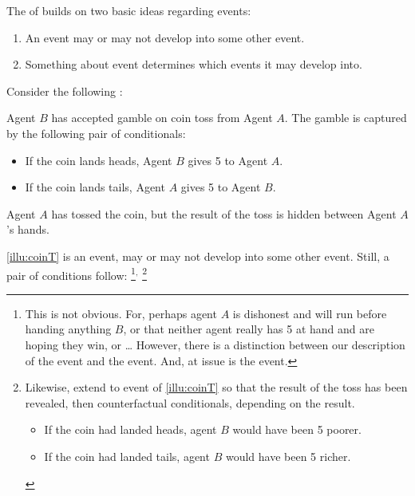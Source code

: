 \begin{note}
  The \itc{} of \qWhyV{} builds on two basic ideas regarding events:
  \begin{enumerate}
  \item
    An event may or may not develop into some other event.
  \item
    Something about event determines which events it may develop into.
  \end{enumerate}

  Consider the following :

  \begin{scenario}%
    \label{illu:coinT}%
    Agent \(B\) has accepted gamble on coin toss from Agent \(A\).
    The gamble is captured by the following pair of conditionals:
    \begin{itemize}[noitemsep]
    \item
      If the coin lands heads, Agent \(B\) gives \texteuro{}5 to Agent \(A\).
    \item
      If the coin lands tails, Agent \(A\) gives \texteuro{}5 to Agent \(B\).
    \end{itemize}

    Agent \(A\) has tossed the coin, but the result of the toss is hidden between Agent \(A\)'s hands.
  \end{scenario}

  \autoref{illu:coinT} is an event, may or may not develop into some other event.
  Still, a pair of conditions follow:%
  \footnote{
    \label{fn:desc-con-caveat}
    This is not obvious.
    For, perhaps agent \(A\) is dishonest and will run before handing anything \(B\), or that neither agent really has \texteuro{}5 at hand and are hoping they win, or \dots
    However, there is a distinction between our description of the event and the event.
    And, at issue is the event.
  }\(^{,}\)%
  \footnote{
    \nocite{Tichy:1976tp}%
    Likewise, extend to event of \autoref{illu:coinT} so that the result of the toss has been revealed, then counterfactual conditionals, depending on the result.

    \begin{itemize}[noitemsep]
    \item
      If the coin had landed heads, agent \(B\) would have been \texteuro{}5 poorer.
    \item
      If the coin had landed tails, agent \(B\) would have been \texteuro{}5 richer.
    \end{itemize}

}
\end{note}
